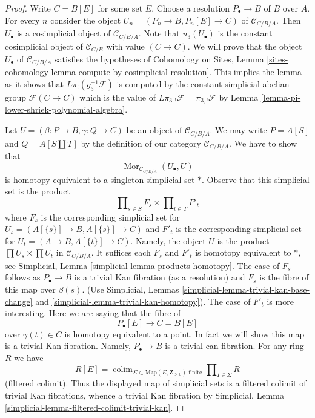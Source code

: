 \documentclass[10pt,a4paper]{amsart}
\theoremstyle{plain}
\theoremstyle{definition}
\theoremstyle{remark}
\numberwithin{equation}{subsection}
\def\colim{\mathop{\mathrm{colim}}\nolimits}
\def\Mor{\mathop{\mathrm{Mor}}\nolimits}
\begin{document}
\begin{proof}
Write $C = B[E]$ for some set $E$. Choose a resolution
$P_\bullet \to B$ of $B$ over $A$. For every $n$ consider
the object $U_n = (P_n \to B, P_n[E] \to C)$ of $\mathcal{C}_{C/B/A}$.
Then $U_\bullet$ is a cosimplicial object of $\mathcal{C}_{C/B/A}$.
Note that $u_3(U_\bullet)$ is the constant cosimplicial
object of $\mathcal{C}_{C/B}$ with value $(C \to C)$.
We will prove that the object $U_\bullet$ of $\mathcal{C}_{C/B/A}$
satisfies the hypotheses of
Cohomology on Sites, Lemma
\ref{sites-cohomology-lemma-compute-by-cosimplicial-resolution}.
This implies the lemma as it shows that $L\pi_!(g_3^{-1}\mathcal{F})$
is computed by the constant simplicial abelian group
$\mathcal{F}(C \to C)$ which is the value of
$L\pi_{3, !}\mathcal{F} = \pi_{3, !}\mathcal{F}$ by
Lemma \ref{lemma-pi-lower-shriek-polynomial-algebra}.

\medskip\noindent
Let $U = (\beta : P \to B, \gamma : Q \to C)$ be an object of
$\mathcal{C}_{C/B/A}$. We may write $P = A[S]$ and $Q = A[S \amalg T]$
by the definition of our category $\mathcal{C}_{C/B/A}$. We have to show that
$$
\Mor_{\mathcal{C}_{C/B/A}}(U_\bullet, U)
$$
is homotopy equivalent to a singleton simplicial set $*$. Observe that this
simplicial set is the product
$$
\prod\nolimits_{s \in S} F_s \times \prod\nolimits_{t \in T} F'_t
$$
where $F_s$ is the corresponding simplicial set for
$U_s = (A[\{s\}] \to B, A[\{s\}] \to C)$
and $F'_t$ is the corresponding simplicial set for
$U_t = (A \to B, A[\{t\}] \to C)$. Namely, the object $U$
is the product $\prod U_s \times \prod U_t$ in $\mathcal{C}_{C/B/A}$.
It suffices each $F_s$ and $F'_t$ is homotopy equivalent to $*$, see
Simplicial, Lemma \ref{simplicial-lemma-products-homotopy}.
The case of $F_s$ follows as $P_\bullet \to B$ is a trivial Kan
fibration (as a resolution) and $F_s$ is the fibre of this map over
$\beta(s)$. (Use Simplicial, Lemmas
\ref{simplicial-lemma-trivial-kan-base-change} and
\ref{simplicial-lemma-trivial-kan-homotopy}).
The case of $F'_t$ is more interesting. Here we are saying that
the fibre of
$$
P_\bullet[E] \longrightarrow C = B[E]
$$
over $\gamma(t) \in C$ is homotopy equivalent to a point. In fact we
will show this map is a trivial Kan fibration. Namely,
$P_\bullet \to B$ is a trivial can fibration. For any ring $R$
we have
$$
R[E] =
\colim_{\Sigma \subset \text{Map}(E, \mathbf{Z}_{\geq 0})\text{ finite}}
\prod\nolimits_{I \in \Sigma} R
$$
(filtered colimit). Thus the displayed map of simplicial sets is a
filtered colimit of trivial Kan fibrations, whence a trivial Kan fibration
by Simplicial, Lemma \ref{simplicial-lemma-filtered-colimit-trivial-kan}.
\end{proof}
\end{document}
